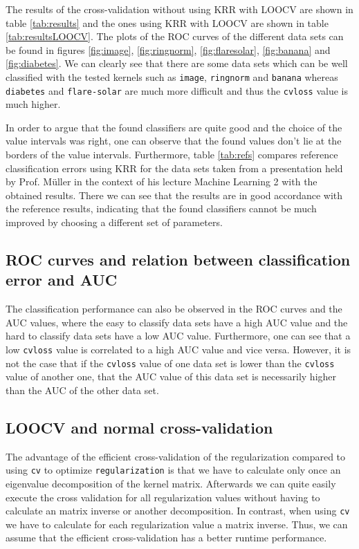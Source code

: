 \documentclass[a4paper, 11pt, titlepage]{article}
\begin{document}
The results of the cross-validation without using KRR with LOOCV are shown in table \ref{tab:results} and the ones using KRR with LOOCV are shown in table \ref{tab:resultsLOOCV}.
The plots of the ROC curves of the different data sets can be found in figures \ref{fig:image}, \ref{fig:ringnorm}, \ref{fig:flaresolar}, \ref{fig:banana} and \ref{fig:diabetes}.
We can clearly see that there are some data sets which can be well classified with the tested kernels such as \texttt{image}, \texttt{ringnorm} and \texttt{banana} whereas \texttt{diabetes} and \texttt{flare-solar} are much more difficult and thus the \texttt{cvloss} value is much higher.

In order to argue that the found classifiers are quite good and the choice of the value intervals was right, one can observe that the found values don't lie at the borders of the value intervals.
Furthermore, table \ref{tab:refs} compares reference classification errors using KRR for the data sets taken from a presentation held by Prof. M\"uller \cite{Mueller13} in the context of his lecture Machine Learning 2 with the obtained results.
There we can see that the results are in good accordance with the reference results, indicating that the found classifiers cannot be much improved by choosing a different set of parameters.

\subsection{ROC curves and relation between classification error and AUC}

The classification performance can also be observed in the ROC curves and the AUC values, where the easy to classify data sets have a high AUC value and the hard to classify data sets have a low AUC value.
Furthermore, one can see that a low \texttt{cvloss} value is correlated to a high AUC value and vice versa.
However, it is not the case that if the \texttt{cvloss} value of one data set is lower than the \texttt{cvloss} value of another one, that the AUC value of this data set is necessarily higher than the AUC of the other data set.

\subsection{LOOCV and normal cross-validation}

The advantage of the efficient cross-validation of the regularization compared to using \texttt{cv} to optimize \texttt{regularization} is that we have to calculate only once an eigenvalue decomposition of the kernel matrix.
Afterwards we can quite easily execute the cross validation for all regularization values without having to calculate an matrix inverse or another decomposition.
In contrast, when using \texttt{cv} we have to calculate for each regularization value a matrix inverse.
Thus, we can assume that the efficient cross-validation has a better runtime performance.
\end{document}
